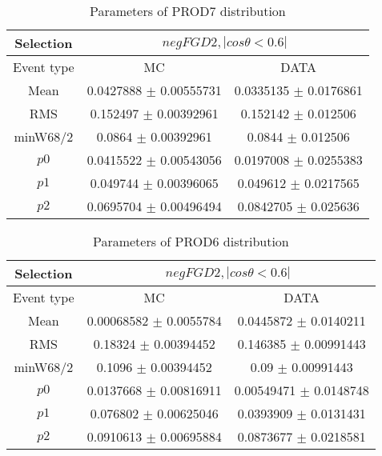 \documentclass[a4paper,12pt]{article}
\begin{document}
\begin{table}[htbp]
\begin{center}
\begin{tabular}{|c|c|c|}
        \hline
        Selection & \multicolumn{2}{|c|}{$negFGD2, |cos\theta<0.6|$}  \\ \hline
        Event type & MC & DATA \\ 
        \hline
        Mean & 0.0427888 $\pm$ 0.00555731 & 0.0335135 $\pm$ 0.0176861 \\ 
        \hline 
        RMS & 0.152497 $\pm$ 0.00392961 & 0.152142 $\pm$ 0.012506 \\ 
        \hline 
        minW68/2 & 0.0864 $\pm$ 0.00392961 & 0.0844 $\pm$ 0.012506 \\ 
        \hline 
        $p0$ & 0.0415522 $\pm$ 0.00543056 & 0.0197008 $\pm$ 0.0255383 \\ 
        \hline 
        $p1$ & 0.049744 $\pm$ 0.00396065 & 0.049612 $\pm$ 0.0217565 \\ 
        \hline 
        $p2$ & 0.0695704 $\pm$ 0.00496494 & 0.0842705 $\pm$ 0.025636 \\ 
        \hline 
\end{tabular}
\caption{Parameters of PROD7 distribution } \vspace{0.2in}
\label{xxx}
\end{center}
\end{table}
\begin{table}[htbp]
\begin{center}
\begin{tabular}{|c|c|c|}
        \hline
        Selection & \multicolumn{2}{|c|}{$negFGD2, |cos\theta<0.6|$}  \\ \hline
        Event type & MC & DATA \\ 
        \hline
        Mean & 0.00068582 $\pm$ 0.0055784 & 0.0445872 $\pm$ 0.0140211 \\ 
        \hline 
        RMS & 0.18324 $\pm$ 0.00394452 & 0.146385 $\pm$ 0.00991443 \\ 
        \hline 
        minW68/2 & 0.1096 $\pm$ 0.00394452 & 0.09 $\pm$ 0.00991443 \\ 
        \hline 
        $p0$ & 0.0137668 $\pm$ 0.00816911 & 0.00549471 $\pm$ 0.0148748 \\ 
        \hline 
        $p1$ & 0.076802 $\pm$ 0.00625046 & 0.0393909 $\pm$ 0.0131431 \\ 
        \hline 
        $p2$ & 0.0910613 $\pm$ 0.00695884 & 0.0873677 $\pm$ 0.0218581 \\ 
        \hline 
\end{tabular}
\caption{Parameters of PROD6 distribution } \vspace{0.2in}
\label{xxx}
\end{center}
\end{table}
\end{document}

